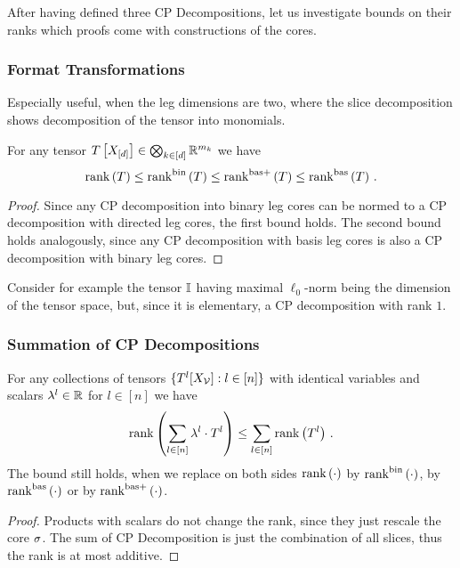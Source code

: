 After having defined three CP Decompositions, let us investigate bounds on their ranks which proofs come with constructions of the cores.


\subsubsection{Format Transformations}

Especially useful, when the leg dimensions are two, where the slice decomposition shows decomposition of the tensor into monomials.


\begin{theorem}\label{the:sliceToCP}
	For any tensor $T\left[X_{[d]}\right]\in\bigotimes_{k\in[d]} \mathbb{R}^{m_{k}}$ we have
		\[ \mathrm{rank}\left(T\right) 
		\leq \mathrm{rank}^{\mathrm{bin}}\left(T\right) 
		\leq \mathrm{rank}^{\mathrm{bas+}}\left(T\right) 
		\leq \mathrm{rank}^{\mathrm{bas}}\left(T\right) \, . \]
\end{theorem}	
\begin{proof}
	Since any CP decomposition into binary leg cores can be normed to a CP decomposition with directed leg cores, the first bound holds.
	The second bound holds analogously, since any CP decomposition with basis leg cores is also a CP decomposition with binary leg cores.
\end{proof}


Consider for example the tensor $\mathbb{I}$ having maximal $\ell_0$-norm being the dimension of the tensor space, but, since it is elementary, a CP decomposition with rank $1$.


\subsubsection{Summation of CP Decompositions}

\begin{theorem}\label{the:CPrankSumBound}
	For any collections of tensors $\{T^{l}[X_{\mathcal{V}}] : l \in [n]\}$ with identical variables and scalars $\lambda^{l} \in \mathbb{R}$ for $l\in[n]$  we have
		\[ \mathrm{rank}\left(\sum_{l \in [n]} \lambda^{l} \cdot T^{l}\right) \leq \sum_{l\in[n]}  \mathrm{rank}\left(T^{l}\right)  \, . \]
	The bound still holds, when we replace on both sides $\mathrm{rank}\left(\cdot\right)$ by $\mathrm{rank}^{\mathrm{bin}}\left(\cdot\right)$, by $\mathrm{rank}^{\mathrm{bas}}\left(\cdot\right)$ or by $\mathrm{rank}^{\mathrm{bas+}}\left(\cdot\right)$.
\end{theorem}
\begin{proof}
	Products with scalars do not change the rank, since they just rescale the core $\sigma$.
	The sum of CP Decomposition is just the combination of all slices, thus the rank is at most additive.
\end{proof}

